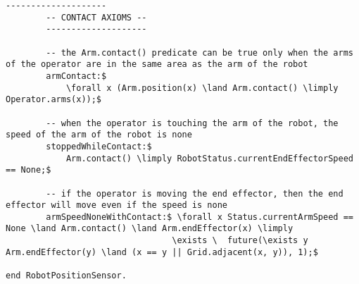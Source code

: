 \begin{lstlisting}[fontadjust, mathescape, frame=single]
        --------------------
        -- CONTACT AXIOMS --
        --------------------

        -- the Arm.contact() predicate can be true only when the arms of the operator are in the same area as the arm of the robot
        armContact:$
            \forall x (Arm.position(x) \land Arm.contact() \limply Operator.arms(x));$

        -- when the operator is touching the arm of the robot, the speed of the arm of the robot is none
        stoppedWhileContact:$
            Arm.contact() \limply RobotStatus.currentEndEffectorSpeed == None;$

        -- if the operator is moving the end effector, then the end effector will move even if the speed is none
        armSpeedNoneWithContact:$ \forall x Status.currentArmSpeed == None \land Arm.contact() \land Arm.endEffector(x) \limply
                                 \exists \  future(\exists y Arm.endEffector(y) \land (x == y || Grid.adjacent(x, y)), 1);$
        
end RobotPositionSensor.\end{lstlisting}